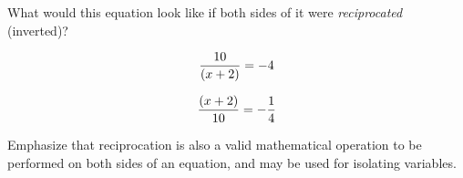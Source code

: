 

What would this equation look like if both sides of it were {\it reciprocated} (inverted)?

$${10 \over (x + 2)} = -4$$







$${(x + 2) \over 10} = -{1 \over 4}$$







Emphasize that reciprocation is also a valid mathematical operation to be performed on both sides of an equation, and may be used for isolating variables.




